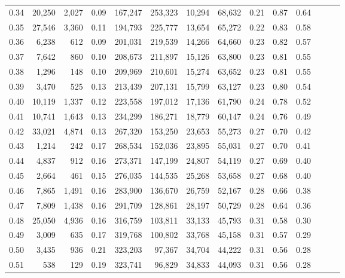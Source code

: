 \begin{tabular}{rrrrrrrrrrrrrr}
0.34 &  20,250 &  2,027 &  0.09 &  167,247 &  253,323 &  10,294 &  68,632 &  0.21 &  0.87 &      0.64 \\
0.35 &  27,546 &  3,360 &  0.11 &  194,793 &  225,777 &  13,654 &  65,272 &  0.22 &  0.83 &      0.58 \\
0.36 &   6,238 &    612 &  0.09 &  201,031 &  219,539 &  14,266 &  64,660 &  0.23 &  0.82 &      0.57 \\
0.37 &   7,642 &    860 &  0.10 &  208,673 &  211,897 &  15,126 &  63,800 &  0.23 &  0.81 &      0.55 \\
0.38 &   1,296 &    148 &  0.10 &  209,969 &  210,601 &  15,274 &  63,652 &  0.23 &  0.81 &      0.55 \\
0.39 &   3,470 &    525 &  0.13 &  213,439 &  207,131 &  15,799 &  63,127 &  0.23 &  0.80 &      0.54 \\
0.40 &  10,119 &  1,337 &  0.12 &  223,558 &  197,012 &  17,136 &  61,790 &  0.24 &  0.78 &      0.52 \\
0.41 &  10,741 &  1,643 &  0.13 &  234,299 &  186,271 &  18,779 &  60,147 &  0.24 &  0.76 &      0.49 \\
0.42 &  33,021 &  4,874 &  0.13 &  267,320 &  153,250 &  23,653 &  55,273 &  0.27 &  0.70 &      0.42 \\
0.43 &   1,214 &    242 &  0.17 &  268,534 &  152,036 &  23,895 &  55,031 &  0.27 &  0.70 &      0.41 \\
0.44 &   4,837 &    912 &  0.16 &  273,371 &  147,199 &  24,807 &  54,119 &  0.27 &  0.69 &      0.40 \\
0.45 &   2,664 &    461 &  0.15 &  276,035 &  144,535 &  25,268 &  53,658 &  0.27 &  0.68 &      0.40 \\
0.46 &   7,865 &  1,491 &  0.16 &  283,900 &  136,670 &  26,759 &  52,167 &  0.28 &  0.66 &      0.38 \\
0.47 &   7,809 &  1,438 &  0.16 &  291,709 &  128,861 &  28,197 &  50,729 &  0.28 &  0.64 &      0.36 \\
0.48 &  25,050 &  4,936 &  0.16 &  316,759 &  103,811 &  33,133 &  45,793 &  0.31 &  0.58 &      0.30 \\
0.49 &   3,009 &    635 &  0.17 &  319,768 &  100,802 &  33,768 &  45,158 &  0.31 &  0.57 &      0.29 \\
0.50 &   3,435 &    936 &  0.21 &  323,203 &   97,367 &  34,704 &  44,222 &  0.31 &  0.56 &      0.28 \\
0.51 &     538 &    129 &  0.19 &  323,741 &   96,829 &  34,833 &  44,093 &  0.31 &  0.56 &      0.28 \\

\end{tabular}
